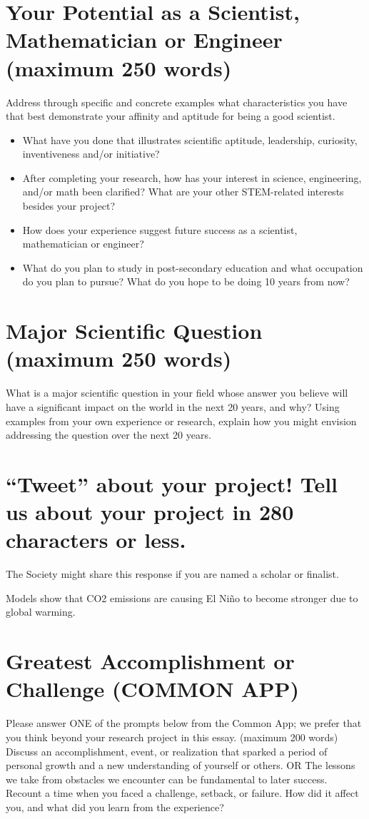\documentclass[little]{basic}
\begin{document}
\section{Your Potential as a Scientist, Mathematician or Engineer (maximum 250 words)}
\label{sec:orgd083e59}
Address through specific and concrete examples what characteristics you have that best demonstrate your affinity and aptitude for being a good scientist.
\begin{itemize}
\item What have you done that illustrates scientific aptitude, leadership, curiosity, inventiveness and/or initiative?
\item After completing your research, how has your interest in science, engineering, and/or math been clarified? What are your other STEM-related interests besides your project?
\item How does your experience suggest future success as a scientist, mathematician or engineer?
\item What do you plan to study in post-secondary education and what occupation do you plan to pursue?  What do you hope to be doing 10 years from now?
\end{itemize}

\section{Major Scientific Question (maximum 250 words)}
\label{sec:org44dc78c}
What is a major scientific question in your field whose answer you believe will have a significant impact on the world in the next 20 years, and why? Using examples from your own experience or research, explain how you might envision addressing the question over the next 20 years.

\section{``Tweet'' about your project! Tell us about your project in 280 characters or less.}
\label{sec:orge35468a}
The Society might share this response if you are named a scholar or finalist.

Models show that CO2 emissions are causing El Niño to become stronger due to global warming.

\section{Greatest Accomplishment or Challenge (COMMON APP)}
\label{sec:org33a2be4}
Please answer ONE of the prompts below from the Common App; we prefer that you think beyond your research project in this essay. (maximum 200 words)
Discuss an accomplishment, event, or realization that sparked a period of personal growth and a new understanding of yourself or others.
OR
The lessons we take from obstacles we encounter can be fundamental to later success. Recount a time when you faced a challenge, setback, or failure. How did it affect you, and what did you learn from the experience?
\end{document}
